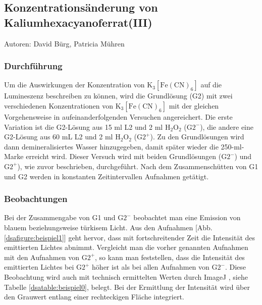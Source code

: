 \subsection{Konzentrationsänderung von Kaliumhexacyanoferrat(III)}

Autoren: David Bürg, Patricia Mühren

\subsubsection{Durchführung}

Um die Auswirkungen der Konzentration von $\mathrm{K}_3[\mathrm{Fe}(\mathrm{CN})_6]$ auf die Lumineszenz beschreiben zu können, wird die Grundlösung (G2) mit zwei verschiedenen Konzentrationen von $\mathrm{K}_3[\mathrm{Fe}(\mathrm{CN})_6]$ mit der gleichen Vorgehensweise in aufeinanderfolgenden Versuchen angereichert. Die erste Variation ist die G2-Lösung aus 15 ml L2 und 2 ml $\mathrm{H}_2\mathrm{O}_2$ ($\mathrm{G}2^-$), die andere eine G2-Lösung aus 60 mL L2 und 2 ml $\mathrm{H}_2\mathrm{O}_2$ ($\mathrm{G}2^+$). Zu den Grundlösungen wird dann demineralisiertes Wasser hinzugegeben, damit später wieder die 250-ml-Marke erreicht wird.
Dieser Versuch wird mit beiden Grundlösungen ($\mathrm{G}2^-$) und $\mathrm{G}2^+$), wie zuvor beschrieben, durchgeführt. Nach dem Zusammenschütten von G1 und G2 werden in konstanten Zeitintervallen Aufnahmen getätigt.
 
\subsubsection{Beobachtungen}

Bei der Zusammengabe von G1 und $\mathrm{G}2^-$ beobachtet man eine Emission von blauem beziehungsweise türkisem Licht.
Aus den Aufnahmen [Abb. \ref{dsafigure:beispiel1}] geht hervor, dass mit fortschreitender Zeit die Intensität des emittierten Lichtes abnimmt. Vergleicht man die vorher genannten Aufnahmen mit den Aufnahmen von $\mathrm{G}2^+$, so kann man feststellen, dass die Intensität des emittierten Lichtes bei $\mathrm{G}2^+$ höher ist als bei allen Aufnahmen von $\mathrm{G}2^-$. Diese Beobachtung wird auch mit technisch ermittelten  Werten durch ImageJ \cite{ImageJ}, siehe Tabelle \ref{dsatable:beispiel0}, belegt. Bei der Ermittlung der Intensität wird über den Grauwert entlang einer rechteckigen Fläche integriert.  

